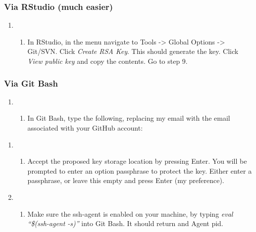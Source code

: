 \documentclass[12pt,]{article}
\providecommand{\tightlist}{%
  \setlength{\itemsep}{0pt}\setlength{\parskip}{0pt}}
\begin{document}
\subsubsection{Via RStudio (much easier)}\label{via-rstudio-much-easier}

\begin{enumerate}
\def\labelenumi{\arabic{enumi}.}
\setcounter{enumi}{5}
\item
  \begin{enumerate}
  \def\labelenumii{\alph{enumii}.}
  \tightlist
  \item
    In RStudio, in the menu navigate to Tools -\textgreater{} Global
    Options -\textgreater{} Git/SVN. Click \emph{Create RSA Key}. This
    should generate the key. Click \emph{View public key} and copy the
    contents. Go to step 9.
  \end{enumerate}
\end{enumerate}

\subsubsection{Via Git Bash}\label{via-git-bash}

\begin{enumerate}
\def\labelenumi{\arabic{enumi}.}
\setcounter{enumi}{5}
\item
  \begin{enumerate}
  \def\labelenumii{\alph{enumii}.}
  \setcounter{enumii}{1}
  \tightlist
  \item
    In Git Bash, type the following, replacing my email with the email
    associated with your GitHub account:
  \end{enumerate}
\end{enumerate}

\begin{quote}
\colorbox{light-gray}{}
\end{quote}

\begin{enumerate}
\def\labelenumi{\arabic{enumi}.}
\setcounter{enumi}{6}
\item
  \begin{enumerate}
  \def\labelenumii{\alph{enumii}.}
  \setcounter{enumii}{1}
  \tightlist
  \item
    Accept the proposed key storage location by pressing Enter. You will
    be prompted to enter an option passphrase to protect the key. Either
    enter a passphrase, or leave this empty and press Enter (my
    preference).
  \end{enumerate}
\item
  \begin{enumerate}
  \def\labelenumii{\alph{enumii}.}
  \setcounter{enumii}{1}
  \tightlist
  \item
    Make sure the ssh-agent is enabled on your machine, by typing
    \emph{eval ``\$(ssh-agent -s)''} into Git Bash. It should return and
    Agent pid.
  \end{enumerate}
\end{enumerate}
\end{document}
